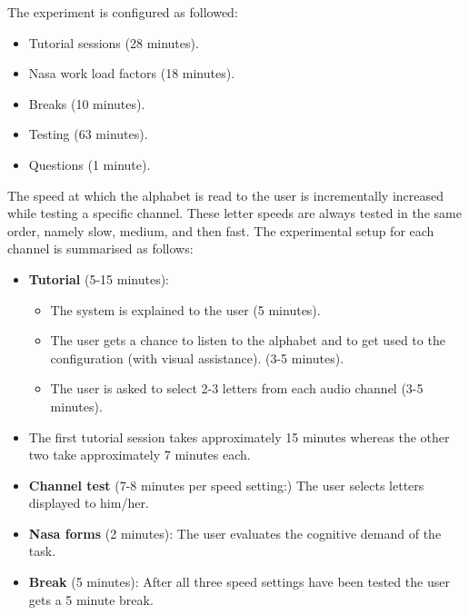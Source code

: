 \documentclass[10pt,fleqn,a4paper]{article}
\begin{document}
The experiment is configured as followed:
\begin{itemize}
 \item Tutorial sessions (28 minutes).
 \item Nasa work load factors (18 minutes).
 \item Breaks (10 minutes).
 \item Testing (63 minutes).
 \item Questions (1 minute).

\end{itemize}
 

The speed at which the alphabet is read to the user is incrementally increased while testing a specific channel. 
These letter speeds are always tested in the same order, namely slow, medium, and then fast. The experimental setup for each channel is summarised  as follows:
\begin{itemize}
\item {\bf Tutorial} (5-15 minutes):
  \begin{itemize} 
  \item The system is explained to the user (5 minutes). 
  \item The user gets a chance to listen to the alphabet and to get used to the configuration (with visual assistance). (3-5 minutes). 
  \item The user is asked to select 2-3 letters from each audio channel (3-5 minutes).
  \end{itemize} 
\item The first tutorial session takes approximately 15 minutes whereas the other two take approximately 7 minutes each.
\item {\bf Channel test} (7-8 minutes per speed setting:) The user selects letters displayed to him/her.
\item {\bf Nasa forms} (2 minutes): The user evaluates the cognitive demand of the task.  
\item {\bf Break} (5 minutes): After all three speed settings have been tested the user gets a 5 minute break. 
\end{itemize}
\end{document}
